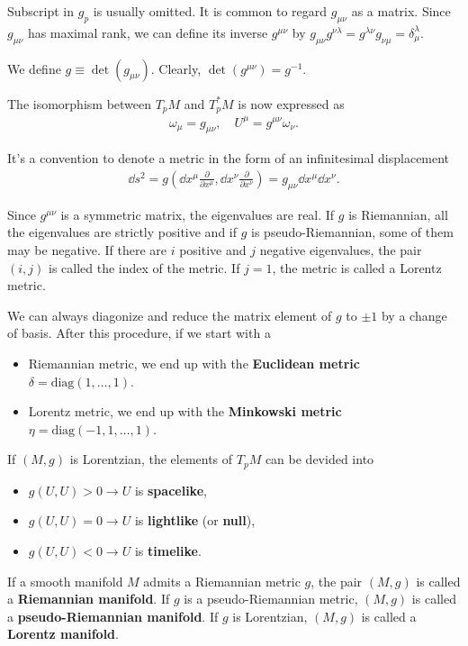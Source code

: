 \documentclass[10pt]{article}
\begin{document}
Subscript in $g_p$ is usually omitted.
It is common to regard $g_{\mu\nu}$ as a matrix.
Since $g_{\mu\nu}$ has maximal rank, we can define its inverse $g^{\mu\nu}$ by $g_{\mu\nu}g^{\nu\lambda}=g^{\lambda\nu}g_{\nu\mu}=\delta^\lambda_\mu$.

We define $g\equiv\det(g_{\mu\nu})$.
Clearly, $\det(g^{\mu\nu})=g^{-1}$.

The isomorphism between $T_p M$ and $T^*_p M$ is now expressed as
\begin{align}
    \omega_\mu=g_{\mu\nu},\quad U^\mu=g^{\mu\nu}\omega_\nu.
\end{align}

It's a convention to denote a metric in the form of an infinitesimal displacement
\begin{align}
    \dd s^2=g(\dd x^\mu\frac{\partial}{\partial x^\mu},\dd x^\nu\frac{\partial}{\partial x^\nu})=g_{\mu\nu}\dd x^\mu\dd x^\nu.
\end{align}

Since $g^{\mu\nu}$ is a symmetric matrix, the eigenvalues are real.
If $g$ is Riemannian, all the eigenvalues are strictly positive and if $g$ is pseudo-Riemannian, some of them may be negative.
If there are $i$ positive and $j$ negative eigenvalues, the pair $(i, j)$ is called the index of the metric.
If $j = 1$, the metric is called a Lorentz metric.

We can always diagonize and reduce the matrix element of $g$ to $\pm1$ by a change of basis.
After this procedure, if we start with a
\begin{itemize}
    \item Riemannian metric, we end up with the \textbf{Euclidean metric} $\delta=\text{diag}(1,\dots,1)$.
    \item Lorentz metric, we end up with the \textbf{Minkowski metric} $\eta=\text{diag}(-1,1,\dots,1)$.
\end{itemize}

If $(M,g)$ is Lorentzian, the elements of $T_p M$ can be devided into
\begin{itemize}
    \item $g(U,U)>0\to U$ is \textbf{spacelike},
    \item $g(U,U)=0\to U$ is \textbf{lightlike} (or \textbf{null}),
    \item $g(U,U)<0\to U$ is \textbf{timelike}.
\end{itemize}

If a smooth manifold $M$ admits a Riemannian metric $g$, the pair $(M, g)$ is called a \textbf{Riemannian manifold}.
If $g$ is a pseudo-Riemannian metric, $(M,g)$ is called a \textbf{pseudo-Riemannian manifold}.
If $g$ is Lorentzian, $(M, g)$ is called a \textbf{Lorentz manifold}.
\end{document}
